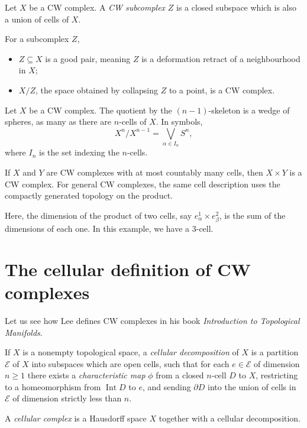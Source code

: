 \begin{definition}
Let $X$ be a CW complex. A \emph{CW
subcomplex} $Z$ is a
closed subspace which is also a union of
cells of $X$.
\end{definition}

\begin{remark}
For a subcomplex $Z$,
\begin{itemize}
\item $Z\subseteq X$ is a good pair, meaning
$Z$ is a
deformation retract of a neighbourhood in
$X$;
\item $X/Z$, the space obtained by collapsing
$Z$ to a point,
is a CW complex.
\end{itemize}
\end{remark}

\begin{remark}
Let $X$ be a CW complex. The quotient by the
$(n-1)$-skeleton
is a wedge of spheres, as many as there are
$n$-cells of $X$. In symbols,
$$
X^n/X^{n-1}=\bigvee_{\alpha\in I_n}S^n,
$$
where $I_n$ is the set indexing the
$n$-cells.
\end{remark}

\label{section-cw-compl-relat-cw-compl}
\label{section-topol-produ-cw-compl}
\begin{theorem}
If $X$ and $Y$ are CW complexes with at most
countably many
cells, then $X\times Y$ is a CW complex.
For general CW complexes, the same cell
description uses the compactly generated
topology on the product.
\end{theorem}

Here, the dimension of the product of two
cells, say
$e^1_\alpha\times e^2_\beta$, is the sum of
the dimensions of
each one. In this example, we have a 3-cell.
\section{The cellular definition of CW
complexes}
\label{section-cellular-cw-definition}

Let us see how Lee defines CW complexes in
his book
\textit{Introduction to Topological
Manifolds}.

\begin{definition}
If $X$ is a nonempty topological space, a
\emph{cellular
decomposition} of $X$ is a partition
$\mathcal E$ of $X$ into
subspaces which are open cells, such that for
each
$e\in\mathcal E$ of dimension $n\geq1$ there
exists a
\emph{characteristic map} $\phi$ from a
closed $n$-cell $D$
to $X$, restricting to a homeomorphism from
$\operatorname{Int}D$ to
$e$, and sending $\partial D$ into the union
of cells in
$\mathcal E$ of dimension strictly less than
$n$.

A \emph{cellular complex} is a Hausdorff
space $X$ together
with a cellular decomposition.
\end{definition}

